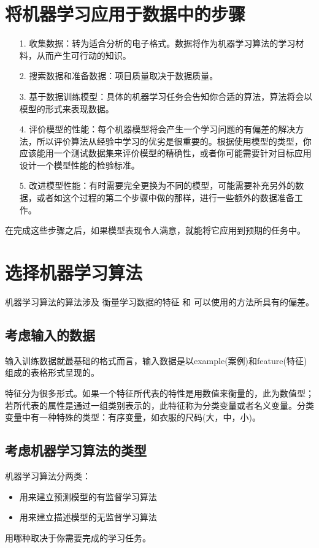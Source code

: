 \documentclass[11pt,a4paper,oneside]{book}
\begin{document}
\section{将机器学习应用于数据中的步骤}
\begin{enumerate}
	\item[1.]收集数据：转为适合分析的电子格式。数据将作为机器学习算法的学习材料，从而产生可行动的知识。
	\item[2.]搜索数据和准备数据：项目质量取决于数据质量。
	\item[3.]基于数据训练模型：具体的机器学习任务会告知你合适的算法，算法将会以模型的形式来表现数据。
	\item[4.]评价模型的性能：每个机器模型将会产生一个学习问题的有偏差的解决方法，所以评价算法从经验中学习的优劣是很重要的。根据使用模型的类型，你应该能用一个测试数据集来评价模型的精确性，或者你可能需要针对目标应用设计一个模型性能的检验标准。
	\item[5.]改进模型性能：有时需要完全更换为不同的模型，可能需要补充另外的数据，或者如这个过程的第二个步骤中做的那样，进行一些额外的数据准备工作。
\end{enumerate}


在完成这些步骤之后，如果模型表现令人满意，就能将它应用到预期的任务中。

\section{选择机器学习算法}
机器学习算法的算法涉及 衡量学习数据的特征 和 可以使用的方法所具有的偏差。
\subsection{考虑输入的数据}
输入训练数据就最基础的格式而言，输入数据是以example(案例)和feature(特征)组成的表格形式呈现的。

特征分为很多形式。如果一个特征所代表的特性是用数值来衡量的，此为数值型；若所代表的属性是通过一组类别表示的，此特征称为分类变量或者名义变量。分类变量中有一种特殊的类型：有序变量，如衣服的尺码(大，中，小)。
\subsection{考虑机器学习算法的类型}
机器学习算法分两类：
\begin{itemize}
	\item 用来建立预测模型的有监督学习算法
	\item 用来建立描述模型的无监督学习算法
\end{itemize}
用哪种取决于你需要完成的学习任务。
\end{document}
